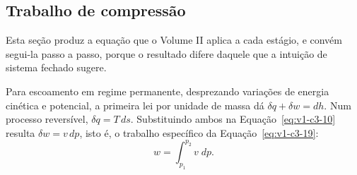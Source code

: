 \documentclass[12pt,a4paper]{article}
\numberwithin{equation}{section}
\numberwithin{table}{section}
\numberwithin{figure}{section}
\begin{document}
\begin{table}[H]
\centering
\caption[Processos ideais para gás ideal]{Processos termodinâmicos ideais para
gás ideal, com o trabalho de sistema fechado ($\int p\,dv$) e o de escoamento
em regime permanente ($\int v\,dp$).}
\label{tab:v1-c3-1}
\small
{}
\end{table}

\subsection{Trabalho de compressão}\label{sub:v1-c3-trabalho}

Esta seção produz a equação que o Volume II aplica a cada estágio, e convém
segui-la passo a passo, porque o resultado difere daquele que a intuição de
sistema fechado sugere.

Para escoamento em regime permanente, desprezando variações de energia cinética
e potencial, a primeira lei por unidade de massa dá $\delta q + \delta w = dh$.
Num processo reversível, $\delta q = T\,ds$. Substituindo ambos na
Equação~\eqref{eq:v1-c3-10} resulta $\delta w = v\,dp$, isto é, o trabalho
específico da Equação~\eqref{eq:v1-c3-19}:
\begin{equation}\label{eq:v1-c3-19}
w = \int_{p_1}^{p_2} v \; dp .
\end{equation}
\end{document}
